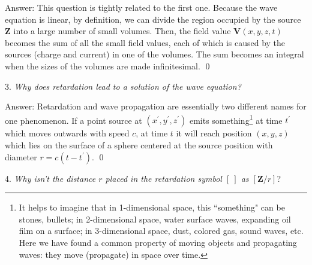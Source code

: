 \documentclass[11pt]{article}              %
\begin{document}
Answer: This question is tightly related to the first one. Because the wave equation is linear, by definition, we can divide the region occupied by the source ${\mathbf Z}$ into a large number of small volumes. Then, the field value ${\mathbf V}(x,y,z,t)$ becomes the sum of all the small field values, each of which is caused by the sources (charge and current) in one of the volumes. The sum becomes an integral when the sizes of the volumes are made infinitesimal. 
\qed

3. {\it Why does retardation lead to a solution of the wave equation? } 

Answer: %
Retardation and wave propagation are essentially two different names for one phenomenon. If a point source at $(x^\prime,y^\prime,z^\prime)$ emits something\footnote{It helps to imagine that in 1-dimensional space, this ``something" can be stones, bullets; in 2-dimensional space, water surface waves, expanding oil film on a surface; in 3-dimensional space, dust, colored gas, sound waves, etc. Here we have found a common property of moving objects and propagating waves: they move (propagate) in space over time.} at time $t^\prime$ which moves outwards with speed $c$, at time $t$ it will reach position $(x,y,z)$ which lies on the surface of a sphere centered at the source position with diameter $r=c(t-t^\prime)$. %
\qed

4. {\it Why isn't the distance $r$ placed in the retardation symbol $[\ ]$ as $[{\mathbf Z}/r]$}?
\end{document}
